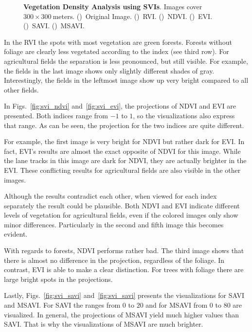 \begin{figure}
    \caption[Vegetation Density Analysis using SVIs]
    {\textbf{Vegetation Density Analysis using SVIs}. Images cover $300\times 300~\text{meters}$.
    ()~Original Image.
    ()~RVI.
    ()~NDVI.
    ()~EVI.
    ()~SAVI.
    ()~MSAVI.}
    \label{fig:vegetation_examples}
\end{figure}

In the RVI the spots with most vegetation are green forests. Forests without foliage are clearly less vegetated according to the index (see third row). For agricultural fields the separation is less pronounced, but still visible. For example, the fields in the last image shows only slightly different shades of gray. Interestingly, the fields in the leftmost image show up very bright compared to all other fields.

In Figs.~\ref{fig:svi_ndvi} and~\ref{fig:svi_evi}, the projections of NDVI and EVI are presented. Both indices range from $-1$ to $1$, so the visualizations also express that range. As can be seen, the projection for the two indices are quite different.

For example, the first image is very bright for NDVI but rather dark for EVI. In fact, EVI's results are almost the exact opposite of NDVI for this image. While the lane tracks in this image are dark for NDVI, they are actually brighter in the EVI. These conflicting results for agricultural fields are also visible in the other images.

Although the results contradict each other, when viewed for each index separately the result could be plausible. Both NDVI and EVI indicate different levels of vegetation for agricultural fields, even if the colored images only show minor differences. Particularly in the second and fifth image this becomes evident.

With regards to forests, NDVI performs rather bad. The third image shows that there is almost no difference in the projection, regardless of the foliage. In contrast, EVI is able to make a clear distinction. For trees with foliage there are large bright spots in the projections.

Lastly, Figs.~\ref{fig:svi_savi} and~\ref{fig:svi_savi} presents the visualizations for SAVI and MSAVI. For SAVI the ranges from $0$ to $20$ and for MSAVI from $0$ to $80$ are visualized. In general, the projections of MSAVI yield much higher values than SAVI. That is why the visualizations of MSAVI are much brighter.

